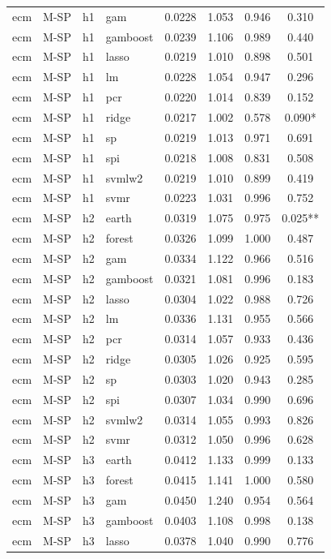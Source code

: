 \begin{ThreePartTable}
\begin{longtable}[t]{llclcccc}
ecm & M-SP & h1 & gam & 0.0228 & 1.053 & 0.946 & 0.310\\
ecm & M-SP & h1 & gamboost & 0.0239 & 1.106 & 0.989 & 0.440\\
ecm & M-SP & h1 & lasso & 0.0219 & 1.010 & 0.898 & 0.501\\
ecm & M-SP & h1 & lm & 0.0228 & 1.054 & 0.947 & 0.296\\
ecm & M-SP & h1 & pcr & 0.0220 & 1.014 & 0.839 & 0.152\\
ecm & M-SP & h1 & ridge & 0.0217 & 1.002 & 0.578 & 0.090*\\
ecm & M-SP & h1 & sp & 0.0219 & 1.013 & 0.971 & 0.691\\
ecm & M-SP & h1 & spi & 0.0218 & 1.008 & 0.831 & 0.508\\
ecm & M-SP & h1 & svmlw2 & 0.0219 & 1.010 & 0.899 & 0.419\\
ecm & M-SP & h1 & svmr & 0.0223 & 1.031 & 0.996 & 0.752\\
\addlinespace
ecm & M-SP & h2 & earth & 0.0319 & 1.075 & 0.975 & 0.025**\\
ecm & M-SP & h2 & forest & 0.0326 & 1.099 & 1.000 & 0.487\\
ecm & M-SP & h2 & gam & 0.0334 & 1.122 & 0.966 & 0.516\\
ecm & M-SP & h2 & gamboost & 0.0321 & 1.081 & 0.996 & 0.183\\
ecm & M-SP & h2 & lasso & 0.0304 & 1.022 & 0.988 & 0.726\\
ecm & M-SP & h2 & lm & 0.0336 & 1.131 & 0.955 & 0.566\\
ecm & M-SP & h2 & pcr & 0.0314 & 1.057 & 0.933 & 0.436\\
ecm & M-SP & h2 & ridge & 0.0305 & 1.026 & 0.925 & 0.595\\
ecm & M-SP & h2 & sp & 0.0303 & 1.020 & 0.943 & 0.285\\
ecm & M-SP & h2 & spi & 0.0307 & 1.034 & 0.990 & 0.696\\
ecm & M-SP & h2 & svmlw2 & 0.0314 & 1.055 & 0.993 & 0.826\\
ecm & M-SP & h2 & svmr & 0.0312 & 1.050 & 0.996 & 0.628\\
\addlinespace
ecm & M-SP & h3 & earth & 0.0412 & 1.133 & 0.999 & 0.133\\
ecm & M-SP & h3 & forest & 0.0415 & 1.141 & 1.000 & 0.580\\
ecm & M-SP & h3 & gam & 0.0450 & 1.240 & 0.954 & 0.564\\
ecm & M-SP & h3 & gamboost & 0.0403 & 1.108 & 0.998 & 0.138\\
ecm & M-SP & h3 & lasso & 0.0378 & 1.040 & 0.990 & 0.776\\

\end{longtable}
\end{ThreePartTable}
